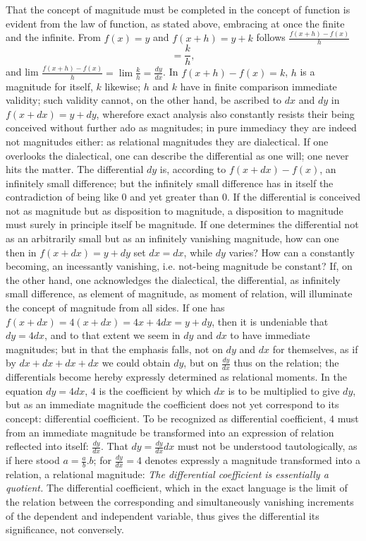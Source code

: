 \documentclass[12pt,a4paper,openany]{book}
\newcommand{\opage}[1]{\marginnote{\footnotesize\textit{[#1]}}}
\begin{document}
\setcounter{footnote}{0}%
\opage{80}That the concept of magnitude must be completed in the concept of function
is evident from the law of function, as stated above,
embracing at once the finite and the infinite.
From $f(x)=y$ and $f(x+h)=y+k$ follows $\frac{f(x+h)-f(x)}{h}$
\[ =\frac{k}{h}, \]
and lim $\frac{f(x+h)-f(x)}{h}=\lim\frac{k}{h}=\frac{dy}{dx}$.
In $f(x+h)-f(x)=k$, $h$ is a magnitude for itself, $k$ likewise; $h$ and $k$ have in finite comparison immediate validity; such
validity cannot, on the other hand, be ascribed to $dx$ and $dy$ in $f(x+dx)=y+dy$, wherefore exact analysis also
constantly resists their being conceived without further ado as
magnitudes; in pure immediacy they are indeed not
magnitudes either: as relational magnitudes they are dialectical. If one overlooks
the dialectical, one can describe the differential
as one will; one never hits the matter. The differential $dy$ is, according to $f(x+dx)-f(x)$, an infinitely small difference;
but the infinitely small difference has in itself the contradiction
of being like $0$ and yet greater than $0$. If the differential
is conceived not as magnitude but as disposition to magnitude, a
disposition to magnitude must surely in principle itself be magnitude.
If one determines the differential not as an arbitrarily
small but as an infinitely vanishing magnitude, how
can one then in $f(x+dx)=y+dy$ set $dx=dx$, while $dy$ varies? How can a constantly becoming, an
incessantly vanishing, i.e. not-being magnitude be
constant? If, on the other hand, one acknowledges the dialectical,
the differential, as infinitely small difference, as element of magnitude,
as moment of relation, will illuminate the concept of magnitude from all sides.
If one has $f(x+dx)=4(x+dx)=4x+4dx=y+dy$, then it is undeniable that $dy=4dx$, and to that extent
we seem in $dy$ and $dx$ to have immediate magnitudes; but in that the emphasis falls, not on $dy$ and $dx$ for themselves, as if
by $dx+dx+dx+dx$ we could obtain $dy$, but on $\frac{dy}{dx}$
\setcounter{footnote}{0}%
\opage{81}thus on the relation; the differentials become hereby expressly %
determined as relational moments. In the equation $dy=4dx$, $4$ is the coefficient by which $dx$ is to be multiplied to
give $dy$, but as an immediate magnitude the coefficient
does not yet correspond to its concept: differential coefficient.
To be recognized as differential coefficient, $4$ must from an %
immediate magnitude be transformed into an expression of relation reflected into itself:
$\frac{dy}{dx}$. That $dy=\frac{dy}{dx}dx$ must not be understood tautologically,
as if here stood $a=\frac{a}{b}.b$; for $\frac{dy}{dx}=4$ denotes
expressly a magnitude transformed into a relation, a relational magnitude:
\emph{The differential coefficient is essentially a quotient.} The differential coefficient, which in the exact %
language is the limit of the relation between the corresponding
and simultaneously vanishing increments of the dependent
and independent variable, thus gives the differential its
significance, not conversely.
\end{document}
